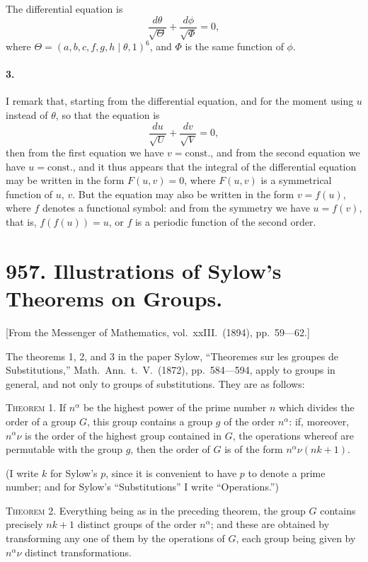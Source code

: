 \documentclass[11pt,a4paper]{book}
\begin{document}
The differential equation is
\[
\frac{d\theta}{\sqrt{\Theta}} + \frac{d\phi}{\sqrt{\Phi}} = 0,
\]
where $\Theta = (a, b, c, f, g, h\mid\theta, 1)^6$, and $\Phi$ is the same function of $\phi$.

\paragraph{3.} I remark that, starting from the differential equation, and for the moment using $u$ instead of $\theta$, so that the equation is
\[
\frac{du}{\sqrt{U}} + \frac{dv}{\sqrt{V}} = 0,
\]
then from the first equation we have $v = \text{const.}$, and from the second equation we have $u = \text{const.}$, and it thus appears that the integral of the differential equation may be written in the form $F(u, v) = 0$, where $F(u, v)$ is a symmetrical function of $u$, $v$. But the equation may also be written in the form $v = f(u)$, where $f$ denotes a functional symbol: and from the symmetry we have $u = f(v)$, that is, $f(f(u)) = u$, or $f$ is a periodic function of the second order.

\newpage

\section*{957. Illustrations of Sylow's Theorems on Groups.}

[From the Messenger of Mathematics, vol.~xxIII.~(1894), pp.~59---62.]

\bigskip

The theorems 1, 2, and 3 in the paper Sylow, ``Theoremes sur les groupes de Substitutions,'' Math.~Ann.~t.~V.~(1872), pp.~584---594, apply to groups in general, and not only to groups of substitutions. They are as follows:

\textsc{Theorem 1.} If $n^\alpha$ be the highest power of the prime number $n$ which divides the order of a group $G$, this group contains a group $g$ of the order $n^\alpha$: if, moreover, $n^\alpha\nu$ is the order of the highest group contained in $G$, the operations whereof are permutable with the group $g$, then the order of $G$ is of the form $n^\alpha\nu(nk+1)$.

(I write $k$ for Sylow's $p$, since it is convenient to have $p$ to denote a prime number; and for Sylow's ``Substitutions'' I write ``Operations.'')

\textsc{Theorem 2.} Everything being as in the preceding theorem, the group $G$ contains precisely $nk+1$ distinct groups of the order $n^\alpha$; and these are obtained by transforming any one of them by the operations of $G$, each group being given by $n^\alpha\nu$ distinct transformations.
\end{document}
